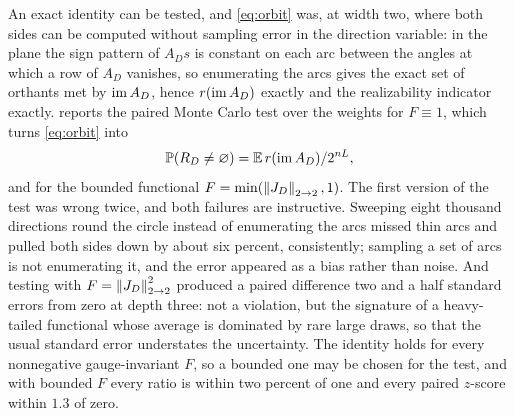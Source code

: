 An exact identity can be tested, and \cref{eq:orbit} was, at width two, where both sides can be computed without sampling error in the direction variable: in the plane the sign pattern of $A_Ds$ is constant on each arc between the angles at which a row of $A_D$ vanishes, so enumerating the arcs gives the exact set of orthants met by $\operatorname{im} A_D$, hence $r(\operatorname{im} A_D)$ exactly and the realizability indicator exactly.  reports the paired Monte Carlo test over the weights for $F\equiv 1$, which turns \cref{eq:orbit} into
\[
\mathbb{P}(R_D\ne\varnothing)=\mathbb{E}\,r(\operatorname{im} A_D)/2^{nL},
\]
and for the bounded functional $F=\min(\left\lVert J_D\right\rVert_{2\to 2},1)$. The first version of the test was wrong twice, and both failures are instructive. Sweeping eight thousand directions round the circle instead of enumerating the arcs missed thin arcs and pulled both sides down by about six percent, consistently; sampling a set of arcs is not enumerating it, and the error appeared as a bias rather than noise. And testing with $F=\left\lVert J_D\right\rVert_{2\to 2}^2$ produced a paired difference two and a half standard errors from zero at depth three: not a violation, but the signature of a heavy-tailed functional whose average is dominated by rare large draws, so that the usual standard error understates the uncertainty. The identity holds for every nonnegative gauge-invariant $F$, so a bounded one may be chosen for the test, and with bounded $F$ every ratio is within two percent of one and every paired $z$-score within $1.3$ of zero.

